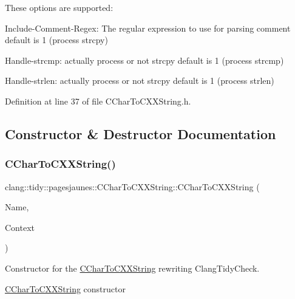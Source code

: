 These options are supported\+:
\begin{DoxyItemize}
\item {\ttfamily Include-\/\+Comment-\/\+Regex}\+: The regular expression to use for parsing comment default is 1 (process strcpy)
\item {\ttfamily Handle-\/strcmp}\+: actually process or not strcpy default is 1 (process strcmp)
\item {\ttfamily Handle-\/strlen}\+: actually process or not strcpy default is 1 (process strlen) 
\end{DoxyItemize}

Definition at line 37 of file C\+Char\+To\+C\+X\+X\+String.\+h.



\subsection{Constructor \& Destructor Documentation}
\mbox{\label{classclang_1_1tidy_1_1pagesjaunes_1_1_c_char_to_c_x_x_string_ae4b2b5f44a0edf261c3afbf773ae909c}} 
\subsubsection{\texorpdfstring{C\+Char\+To\+C\+X\+X\+String()}{CCharToCXXString()}}
{\footnotesize\ttfamily clang\+::tidy\+::pagesjaunes\+::\+C\+Char\+To\+C\+X\+X\+String\+::\+C\+Char\+To\+C\+X\+X\+String (\begin{DoxyParamCaption}\item[{String\+Ref}]{Name,  }\item[{Clang\+Tidy\+Context $\ast$}]{Context }\end{DoxyParamCaption})}



Constructor for the \hyperlink{classclang_1_1tidy_1_1pagesjaunes_1_1_c_char_to_c_x_x_string}{C\+Char\+To\+C\+X\+X\+String} rewriting Clang\+Tidy\+Check. 

\hyperlink{classclang_1_1tidy_1_1pagesjaunes_1_1_c_char_to_c_x_x_string}{C\+Char\+To\+C\+X\+X\+String} constructor

